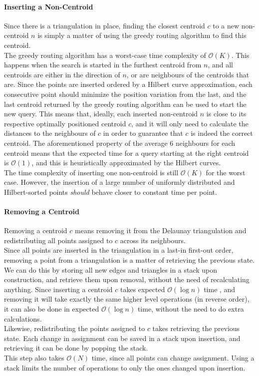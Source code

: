 \paragraph{Inserting a Non-Centroid}
Since there is a triangulation in place, finding the closest centroid $c$ to a new non-centroid $n$ is simply a matter of using the greedy routing algorithm to find this centroid.\\
The greedy routing algorithm has a worst-case time complexity of $\mathcal{O}(K)$. This happens when the search is started in the furthest centroid from $n$, and all centroids are either in the direction of $n$, or are neighbours of the centroids that are. 
Since the points are inserted ordered by a Hilbert curve approximation, each consecutive point should minimize the position variation from the last, and the last centroid returned by the greedy routing algorithm can be used to start the new query. 
This means that, ideally, each inserted non-centroid $n$ is close to its respective optimally positioned centroid $c$, and it will only need to calculate the distances to the neighbours of $c$ in order to guarantee that $c$ is indeed the correct centroid.
The aforementioned property of the average 6 neighbours for each centroid means that the expected time for a query starting at the right centroid is $\mathcal{O}(1)$, and this is heuristically approximated by the Hilbert curves.\\
The time complexity of inserting one non-centroid is still $\mathcal{O}(K)$ for the worst case. However, the insertion of a large number of uniformly distributed and Hilbert-sorted points \textit{should} behave closer to constant time per point.

\paragraph{Removing a Centroid}
Removing a centroid $c$ means removing it from the Delaunay triangulation and redistributing all points assigned to $c$ across its neighbours.\\
Since all points are inserted in the triangulation in a last-in first-out order, removing a point from a triangulation is a matter of retrieving the previous state. We can do this by storing all new edges and triangles in a stack upon construction, and retrieve them upon removal, without the need of recalculating anything. Since inserting a centroid $c$ takes expected $\mathcal{O}(\log{n})$ time \cite{tricomplex}, and removing it will take exactly the same higher level operations (in reverse order), it can also be done in expected $\mathcal{O}(\log{n})$ time, without the need to do extra calculations.\\
Likewise, redistributing the points assigned to $c$ takes retrieving the previous state. Each change in assignment can be saved in a stack upon insertion, and retrieving it can be done by popping the stack.\\
This step also takes $\mathcal{O}(N)$ time, since all points can change assignment. Using a stack limits the number of operations to only the ones changed upon insertion.

